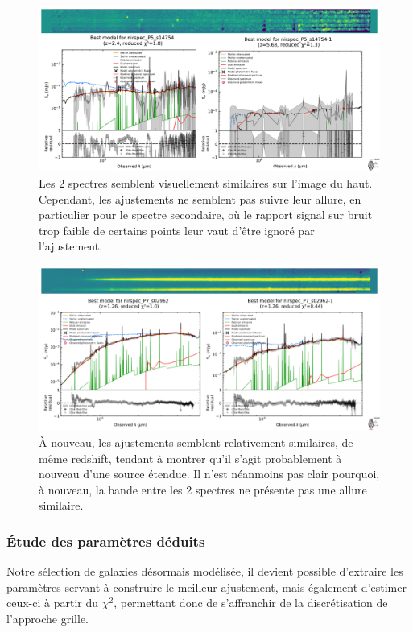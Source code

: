 \documentclass[12pt, a4paper]{article}
\begin{document}
\begin{figure}[!h]
  \centering
  \includegraphics[width=1\textwidth]{assets/double_P5_s14754.png}
  \caption{Les 2 spectres semblent visuellement similaires sur l'image du haut. Cependant, les ajustements ne semblent pas suivre leur allure, en particulier pour le spectre secondaire, où le rapport signal sur bruit trop faible de certains points leur vaut d'être ignoré par l'ajustement.}
  \label{fig:P5_s14754}
\end{figure}

\begin{figure}[!h]
  \centering
  \includegraphics[width=1\textwidth]{assets/double_P7_s02962.png}
  \caption{À nouveau, les ajustements semblent relativement similaires, de même redshift, tendant à montrer qu'il s'agit probablement à nouveau d'une source étendue. Il n'est néanmoins pas clair pourquoi, à nouveau, la bande entre les 2 spectres ne présente pas une allure similaire.}
  \label{fig:P7_s02962}
\end{figure}

\subsubsection{Étude des paramètres déduits}

Notre sélection de galaxies désormais modélisée, il devient possible d'extraire les paramètres servant à construire le meilleur ajustement, mais également d'estimer ceux-ci à partir du $\chi^2$, permettant donc de s'affranchir de la discrétisation de l'approche grille.\\
\end{document}
